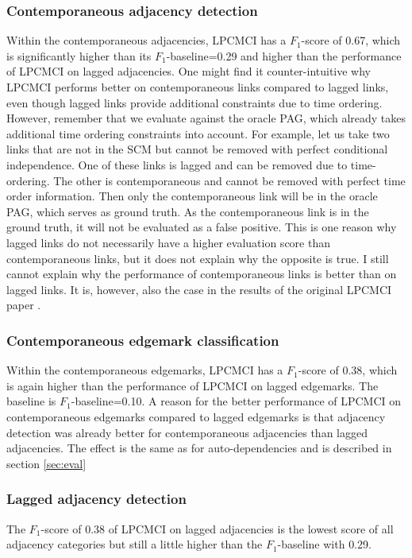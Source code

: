 \documentclass[conference]{IEEEtran}
\begin{document}
\subsubsection{Contemporaneous adjacency detection}
Within the contemporaneous adjacencies, LPCMCI has a $F_1$-score of 0.67, which is significantly higher than its $F_1$-baseline=0.29 and higher than the performance of LPCMCI on lagged adjacencies.
One might find it counter-intuitive why LPCMCI performs better on contemporaneous links compared to lagged links, even though lagged links provide additional constraints due to time ordering. However, remember that we evaluate against the oracle PAG, which already takes additional time ordering constraints into account. For example, let us take two links that are not in the SCM but cannot be removed with perfect conditional independence. One of these links is lagged and can be removed due to time-ordering. The other is contemporaneous and cannot be removed with perfect time order information. Then only the contemporaneous link will be in the oracle PAG, which serves as ground truth. As the contemporaneous link is in the ground truth, it will not be evaluated as a false positive. This is one reason why lagged links do not necessarily have a higher evaluation score than contemporaneous links, but it does not explain why the opposite is true.
I still cannot explain why the performance of contemporaneous links is better than on lagged links.
It is, however, also the case in the results of the original LPCMCI paper \cite{gerhardus_high-recall_2021}.

\subsubsection{Contemporaneous edgemark classification}
Within the contemporaneous edgemarks, LPCMCI has a $F_1$-score of 0.38, which is again higher than the performance of LPCMCI on lagged edgemarks. The baseline is $F_1$-baseline=0.10.
A reason for the better performance of LPCMCI on contemporaneous edgemarks compared to lagged edgemarks is that adjacency detection was already better for contemporaneous adjacencies than lagged adjacencies. The effect is the same as for auto-dependencies and is described in section \ref{sec:eval}

\subsubsection{Lagged adjacency detection}
The $F_1$-score of 0.38 of LPCMCI on lagged adjacencies is the lowest score of all adjacency categories but still a little higher than the $F_1$-baseline with 0.29.
\end{document}
